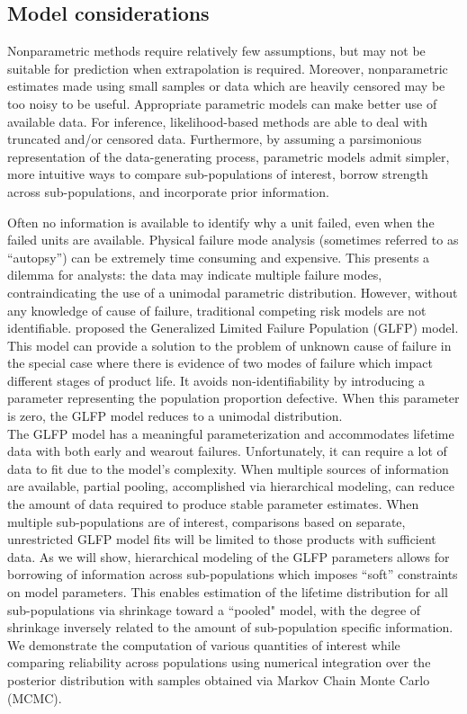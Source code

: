 \documentclass[12pt]{article}
\begin{document}
\subsection{Model considerations}
Nonparametric methods require relatively few assumptions, but may not be suitable for prediction when extrapolation is required. Moreover, nonparametric estimates made using small samples or data which are heavily censored may be too noisy to be useful. Appropriate parametric models can make better use of available data. For inference, likelihood-based methods are able to deal with truncated and/or censored data. Furthermore, by assuming a parsimonious representation of the data-generating process, parametric models admit simpler, more intuitive ways to compare sub-populations of interest, borrow strength across sub-populations, and incorporate prior information. 

Often no information is available to identify why a unit failed, even when the failed units are available. Physical failure mode analysis (sometimes referred to as ``autopsy'') can be extremely time consuming and expensive. This presents a dilemma for analysts: the data may indicate multiple failure modes, contraindicating the use of a unimodal parametric distribution. However, without any knowledge of cause of failure, traditional competing risk models are not identifiable. \citet{chan} proposed the Generalized Limited Failure Population (GLFP) model. This model can provide a solution to the problem of unknown cause of failure in the special case where there is evidence of two modes of failure which impact different stages of product life. It avoids non-identifiability by introducing a parameter representing the population proportion defective. When this parameter is zero, the GLFP model reduces to a unimodal distribution. \\

The GLFP model has a meaningful parameterization and accommodates lifetime data with both early and wearout failures.  Unfortunately, it can require a lot of data to fit due to the model's complexity. When multiple sources of information are available, partial pooling, accomplished via hierarchical modeling, can reduce the amount of data required to produce stable parameter estimates. When multiple sub-populations are of interest, comparisons based on separate, unrestricted GLFP model fits will be limited to those products with sufficient data. As we will show, hierarchical modeling of the GLFP parameters allows for borrowing of information across sub-populations which imposes ``soft'' constraints on model parameters. This enables estimation of the lifetime distribution for all sub-populations via shrinkage toward a ``pooled" model, with the degree of shrinkage inversely related to the amount of sub-population specific information. We demonstrate the computation of various quantities of interest while comparing reliability across populations using numerical integration over the posterior distribution with samples obtained via Markov Chain Monte Carlo (MCMC).
\end{document}
